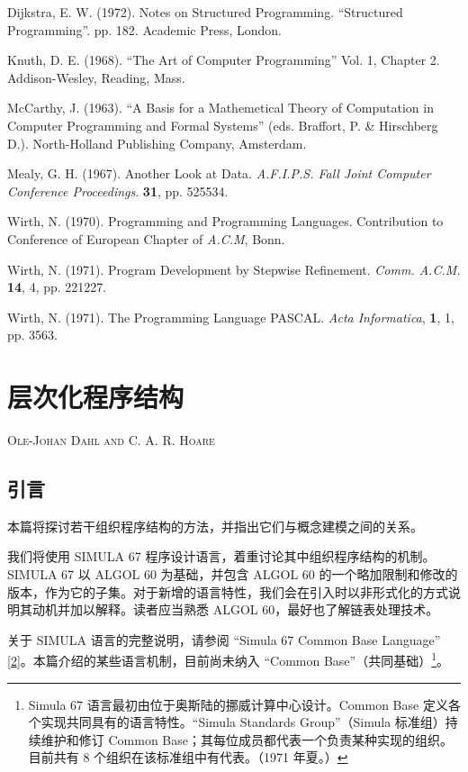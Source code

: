 \documentclass[twoside,11pt,fontset=none]{ctexbook}
\begin{document}
\noindent
Dijkstra, E. W. (1972). Notes on Structured Programming. ``Structured Programming''. pp. 1\textendash{}82. Academic Press, London.
\medskip

\noindent
Knuth, D. E. (1968). ``The Art of Computer Programming'' Vol. 1, Chapter 2. Addison-Wesley, Reading, Mass.
\medskip

\noindent
McCarthy, J. (1963). ``A Basis for a Mathemetical Theory of Computation in Computer Programming and Formal Systems'' (eds. Braffort, P. \& Hirschberg D.). North-Holland Publishing Company, Amsterdam.
\medskip

\noindent
Mealy, G. H. (1967). Another Look at Data. \textit{A.F.I.P.S. Fall Joint Computer Conference Proceedings}. \textbf{31}, pp. 525\textendash{}534.
\medskip

\noindent
Wirth, N. (1970). Programming and Programming Languages. Contribution to Conference of European Chapter of \textit{A.C.M}, Bonn.
\medskip

\noindent
Wirth, N. (1971). Program Development by Stepwise Refinement. \textit{Comm. A.C.M.} \textbf{14}, 4, pp. 221\textendash{}227.
\medskip

\noindent
Wirth, N. (1971). The Programming Language PASCAL. \textit{Acta Informatica}, \textbf{1}, 1, pp. 35\textendash{}63.
\chapter{层次化程序结构}

{
	\noindent
	\scshape\hfill\scriptsize Ole-Johan Dahl and C. A. R. Hoare\hfill
}
\renewcommand{\leftmark}{\normalfont\scriptsize\hfill OLE-JOHAN DAHL AND C. A. R. HOARE\hfill}
\medskip

\section{引言}

本篇将探讨若干组织程序结构的方法，并指出它们与概念建模之间的关系。

我们将使用 SIMULA 67 程序设计语言，着重讨论其中组织程序结构的机制。SIMULA 67 以 ALGOL 60 为基础，并包含 ALGOL 60 的一个略加限制和修改的版本，作为它的子集。对于新增的语言特性，我们会在引入时以非形式化的方式说明其动机并加以解释。读者应当熟悉 ALGOL 60，最好也了解链表处理技术。

关于 SIMULA 语言的完整说明，请参阅 ``Simula 67 Common Base Language'' [\hyperref[ref:2]{2}]。本篇介绍的某些语言机制，目前尚未纳入 ``Common Base''（共同基础）\footnote{Simula 67 语言最初由位于奥斯陆的挪威计算中心设计。Common Base 定义各个实现共同具有的语言特性。``Simula Standards Group''（Simula 标准组）持续维护和修订 Common Base；其每位成员都代表一个负责某种实现的组织。目前共有 8 个组织在该标准组中有代表。（1971 年夏。）}。
\end{document}
